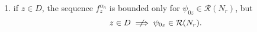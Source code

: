 \documentclass[10pt]{beamer}
\theoremstyle{plain}
\theoremstyle{plain}
\let\phi\varphi
\begin{document}
\begin{frame}
\begin{corollary}
\begin{enumerate}
 \item if $z \in D$, 
the sequence $f_z^{\alpha_n}$ is bounded only for $\psi_{0z}\in\mathcal{R}({N_r})$, but 
$$
z\in D \centernot\implies \psi_{0z}\in\mathcal{R}({N_r}).
$$
\end{enumerate}
\end{corollary}

\end{frame}
\end{document}
